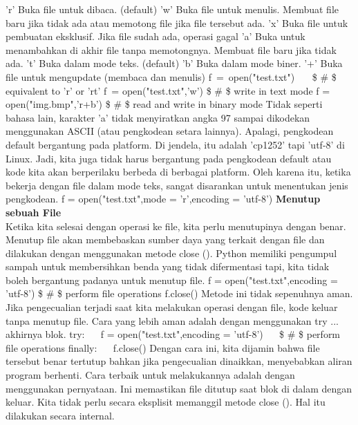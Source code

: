'r' \hspace*{0.5in}  
Buka file untuk dibaca. (default)
'w' \hspace*{0.5in}  
Buka file untuk menulis. Membuat file baru jika tidak ada atau memotong file jika file tersebut ada.  
'x' \hspace*{0.5in}   
Buka file untuk pembuatan eksklusif. Jika file sudah ada, operasi gagal 
'a' \hspace*{0.5in}   
Buka untuk menambahkan di akhir file tanpa memotongnya. Membuat file baru jika tidak ada. 
't' \hspace*{0.5in}   
Buka dalam mode teks. (default)  
'b' 
Buka dalam mode biner.  
'+'  
Buka file untuk mengupdate (membaca dan menulis)  
f~=~open("test.txt")~~~    \$  \#  \$ equivalent to 'r' or 'rt'  
f~= open("test.txt",'w')   \$  \#  \$ write in text mode  
f = open("img.bmp",'r+b')  \$  \#  \$ read and write in binary mode  
Tidak seperti bahasa lain, karakter 'a' tidak menyiratkan angka 97 sampai dikodekan menggunakan ASCII (atau pengkodean setara lainnya). Apalagi, pengkodean default bergantung pada platform. Di jendela, itu adalah 'cp1252' tapi 'utf-8' di Linux. Jadi, kita juga tidak harus bergantung pada pengkodean default atau kode kita akan berperilaku berbeda di berbagai platform. Oleh karena itu, ketika bekerja dengan file dalam mode teks, sangat disarankan untuk menentukan jenis pengkodean.  
f = open("test.txt",mode = 'r',encoding = 'utf-8')  
{\fontsize{14pt}{14pt}\selectfont \textbf{Menutup sebuah File} \\} 
Ketika kita selesai dengan operasi ke file, kita perlu menutupinya dengan benar. Menutup file akan membebaskan sumber daya yang terkait dengan file dan dilakukan dengan menggunakan metode close (). Python memiliki pengumpul sampah untuk membersihkan benda yang tidak difermentasi tapi, kita tidak boleh bergantung padanya untuk menutup file. 
f = open("test.txt",encoding = 'utf-8')  
 \$  \#  \$ perform file operations 
f.close() 
Metode ini tidak sepenuhnya aman. Jika pengecualian terjadi saat kita melakukan operasi dengan file, kode keluar tanpa menutup file. Cara yang lebih aman adalah dengan menggunakan try ... akhirnya blok.
try:  
~~ f = open("test.txt",encoding = 'utf-8')  
~~  \$  \#  \$ perform file operations 
finally: 
~~ f.close() 
Dengan cara ini, kita dijamin bahwa file tersebut benar tertutup bahkan jika pengecualian dinaikkan, menyebabkan aliran program berhenti. Cara terbaik untuk melakukannya adalah dengan menggunakan pernyataan. Ini memastikan file ditutup saat blok di dalam dengan keluar. Kita tidak perlu secara eksplisit memanggil metode close (). Hal itu dilakukan secara internal.  

